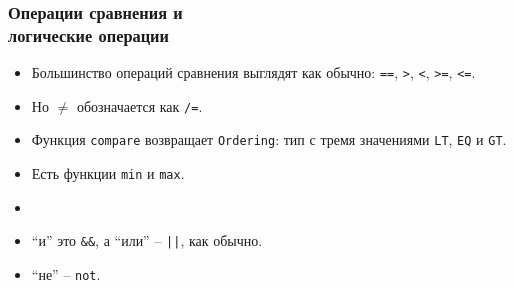 \documentclass[11pt]{beamer}
\begin{document}
\begin{frame}[fragile]
\frametitle{Операции сравнения и\\логические операции}
\begin{itemize}
    \item Большинство операций сравнения выглядят как обычно: \lstinline|==|, \lstinline|>|, \lstinline|<|, \lstinline|>=|, \lstinline|<=|.
    \item Но $\neq$ обозначается как \lstinline|/=|.
    \item Функция \lstinline|compare| возвращает \lstinline|Ordering|: тип с тремя значениями \lstinline|LT|, \lstinline|EQ| и \lstinline|GT|.
    \item Есть функции \lstinline|min| и \lstinline|max|.
    \item[]
    \item \enquote{и} это \lstinline|&&|, а \enquote{или} -- \lstinline!||!, как обычно. 
    \item \enquote{не} -- \lstinline|not|.
\end{itemize}
\end{frame}
\end{document}
